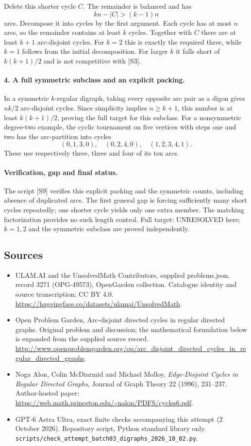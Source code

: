 \documentclass[11pt,a4paper]{article}
\begin{document}
Delete this shorter cycle $C$. The remainder is balanced and has
\[
                 kn-|C|>(k-1)n
\]
arcs. Decompose it into cycles by the first argument. Each cycle
has at most $n$ arcs, so the remainder contains at least $k$ cycles.
Together with $C$ there are at least $k+1$ arc-disjoint cycles.
For $k=2$ this is exactly the required three, while $k=1$ follows
from the initial decomposition. For larger $k$ it falls short of
$k(k+1)/2$ and is not competitive with [S3].

\paragraph{4. A full symmetric subclass and an explicit packing.}
In a symmetric $k$-regular digraph, taking every opposite arc pair
as a digon gives $nk/2$ arc-disjoint cycles. Since simplicity implies
$n\ge k+1$, this number is at least $k(k+1)/2$, proving the full
target for this subclass. For a nonsymmetric degree-two example,
the cyclic tournament on five vertices with steps one and two has
the arc-partition into cycles
\[
            (0,1,3,0),\quad(0,2,4,0),\quad(1,2,3,4,1).
\]
These use respectively three, three and four of its ten arcs.

\paragraph{Verification, gap and final status.}
The script [S9] verifies this explicit packing and the symmetric
counts, including absence of duplicated arcs. The first general gap
is forcing sufficiently many short cycles repeatedly; one shorter
cycle yields only one extra member. The matching factorization
provides no such length control. Full target: UNRESOLVED here;
$k=1,2$ and the symmetric subclass are proved independently.
\subsection{Sources}
\begin{itemize}
\item[S1] ULAM.AI and the UnsolvedMath Contributors, supplied problems.json, record 3271 (OPG-49573), OpenGarden collection. Catalogue identity and source transcription; CC BY 4.0.
\url{https://huggingface.co/datasets/ulamai/UnsolvedMath}.
\item[S2] Open Problem Garden, Arc-disjoint directed cycles in regular directed graphs. Original problem and discussion; the mathematical formulation below is expanded from the supplied source record.
\url{http://www.openproblemgarden.org/op/arc_disjoint_directed_cycles_in_regular_directed_graphs}.
\item[S3] Noga Alon, Colin McDiarmid and Michael Molloy, \emph{Edge-Disjoint Cycles in Regular Directed Graphs}, Journal of Graph Theory 22 (1996), 231--237. Author-hosted paper: \url{https://web.math.princeton.edu/~nalon/PDFS/cycles6.pdf}.
\item[S9] GPT-6 Astra Ultra, exact finite checks accompanying this attempt (2 October 2026). Repository script, Python standard library only. \texttt{scripts/check\_attempt\_batch03\_digraphs\_2026\_10\_02.py}.
\end{itemize}
\end{document}

